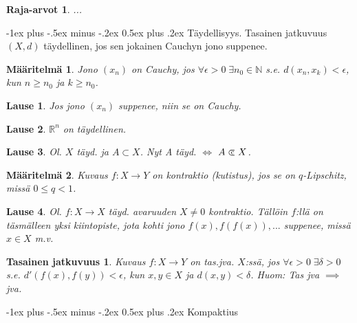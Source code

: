 \documentclass[landscape,a4paper,10pt]{article}
\makeatletter
\renewcommand{\section}{\@startsection{section}{1}{0mm}%
                                {-1ex plus -.5ex minus -.2ex}%
                                {0.5ex plus .2ex}%
                                {\color{blue}\normalfont\large\bfseries}}
\newcommand\cls{\mathrel{\ooalign{$\subset$\cr
\hidewidth\raise.225ex\hbox{$\text{{\scriptsize c}}\mkern2mu$}\cr}}}
\theoremstyle{customtheoremstyle}
\newtheorem*{theorem}{Lause}
\newtheorem*{definition}{Määritelmä}
\makeatother
\begin{document}
\begin{multicols*}{3}
\newtheorem*{defn:rajaarvot}{Raja-arvot}
\begin{defn:rajaarvot}
  ...
\end{defn:rajaarvot}

\section{Täydellisyys. Tasainen jatkuvuus}
$(X,d)$ täydellinen, jos sen jokainen Cauchyn jono suppenee.
\begin{definition}
  Jono $(x_n)$ on Cauchy, jos $\forall \epsilon > 0 \; \exists n_0 \in
  \mathbb{N}$ s.e. $d(x_n, x_k) < \epsilon$, kun $n \geq n_0$ ja $k \geq n_0$.
\end{definition}

\begin{theorem}
  Jos jono $(x_n)$ suppenee, niin se on Cauchy.
\end{theorem}

\begin{theorem}
  $\mathbb{R}^n$ on täydellinen.
\end{theorem}

\begin{theorem}
  Ol. $X$ täyd. ja $A \subset X$. Nyt A täyd. $\iff$ $A \cls X$.
\end{theorem}

\begin{definition}
  Kuvaus $f: X \rightarrow Y$ on kontraktio (kutistus), jos se on
  $q$-Lipschitz, missä $0 \leq q < 1$.
\end{definition}

\begin{theorem}
  Ol. $f: X \rightarrow X$ täyd. avaruuden $X \neq 0$ kontraktio. Tällöin
  $f$:llä on täsmälleen yksi kiintopiste, jota kohti jono $f(x), f(f(x)), ...$
  suppenee, missä $x \in X$ m.v.
\end{theorem}

\newtheorem*{defn:tasjva}{Tasainen jatkuvuus}
\begin{defn:tasjva}
  Kuvaus $f: X \rightarrow Y$ on tas.jva. $X$:ssä, jos $\forall \epsilon > 0 \;
  \exists \delta > 0$ s.e. $d'(f(x), f(y)) < \epsilon$, kun $x,y \in X$ ja
  $d(x,y) < \delta$. Huom: Tas jva $\implies$ jva.
\end{defn:tasjva}



\section{Kompaktius}

\end{multicols*}
\end{document}
